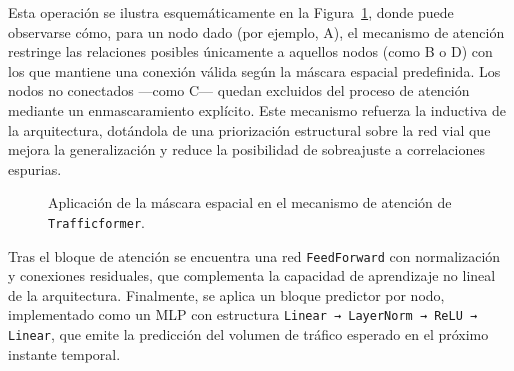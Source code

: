 Esta operación se ilustra esquemáticamente en la Figura~\ref{fig:attention_masking}, donde puede observarse cómo, para un nodo dado (por ejemplo, A), el mecanismo de atención restringe las relaciones posibles únicamente a aquellos nodos (como B o D) con los que mantiene una conexión válida según la máscara espacial predefinida. Los nodos no conectados —como C— quedan excluidos del proceso de atención mediante un enmascaramiento explícito. Este mecanismo refuerza la inductiva de la arquitectura, dotándola de una priorización estructural sobre la red vial que mejora la generalización y reduce la posibilidad de sobreajuste a correlaciones espurias.

\begin{figure}[H]
	\centering
	\caption{Aplicación de la máscara espacial en el mecanismo de atención de \texttt{Trafficformer}.}
	\label{fig:attention_masking}
\end{figure}

Tras el bloque de atención se encuentra una red \texttt{FeedForward} con normalización y conexiones residuales, que complementa la capacidad de aprendizaje no lineal de la arquitectura. Finalmente, se aplica un bloque predictor por nodo, implementado como un MLP con estructura \texttt{Linear → LayerNorm → ReLU → Linear}, que emite la predicción del volumen de tráfico esperado en el próximo instante temporal.

